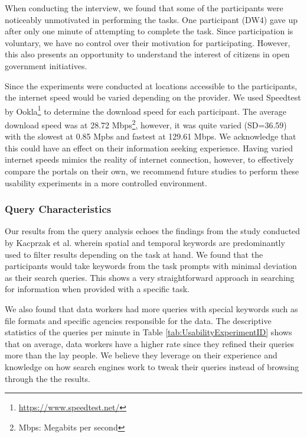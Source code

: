 \documentclass{sigchi}
\begin{document}
When conducting the interview, we found that some of the participants were noticeably unmotivated in performing the tasks. One participant (DW4) gave up after only one minute of attempting to complete the task. Since participation is voluntary, we have no control over their motivation for participating. However, this also presents an opportunity to understand the interest of citizens in open government initiatives.


Since the experiments were conducted at locations accessible to the participants, the internet speed would be varied depending on the provider. We used Speedtest by Ookla\footnote{\url{https://www.speedtest.net/}} to determine the download speed for each participant. The average download speed was at 28.72 Mbps\footnote{Mbps: Megabits per second}, however, it was quite varied (SD=36.59) with the slowest at 0.85 Mpbs and fastest at 129.61 Mbps. We acknowledge that this could have an effect on their information seeking experience. Having varied internet speeds mimics the reality of internet connection, however, to effectively compare the portals on their own, we recommend future studies to perform these usability experiments in a more controlled environment.


\subsubsection{Query Characteristics}
Our results from the query analysis echoes the findings from  the study conducted by Kacprzak et al. \cite{kacprzak2019characterising} wherein spatial and temporal keywords are predominantly used to filter results depending on the task at hand. We found that the participants would take keywords from the task prompts with minimal deviation as their search queries. This shows a very straightforward approach in searching for information when provided with a specific task.

We also found that data workers had more queries with special keywords such as file formats and specific agencies responsible for the data. The descriptive statistics of the queries per minute in Table \ref{tab:UsabilityExperimentID} shows that on average, data workers have a higher rate since they refined their queries more than the lay people. We believe they leverage on their experience and knowledge on how search engines work to tweak their queries instead of browsing through the the results.
\end{document}
